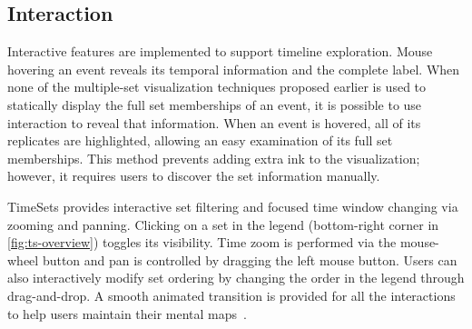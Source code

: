 \subsection{Interaction}
\label{sub:interaction}
Interactive features are implemented to support timeline exploration. Mouse hovering an event reveals its temporal information and the complete label. When none of the multiple-set visualization techniques proposed earlier is used to statically display the full set memberships of an event, it is possible to use interaction to reveal that information. When an event is hovered, all of its replicates are highlighted, allowing an easy examination of its full set memberships. This method prevents adding extra ink to the visualization; however, it requires users to discover the set information manually.

TimeSets provides interactive set filtering and focused time window changing via zooming and panning. Clicking on a set in the legend (bottom-right corner in \autoref{fig:ts-overview}) toggles its visibility. Time zoom is performed via the mouse-wheel button and pan is controlled by dragging the left mouse button. Users can also interactively modify set ordering by changing the order in the legend through drag-and-drop. A smooth animated transition is provided for all the interactions to help users maintain their mental maps~\cite{Elmqvist2011}.